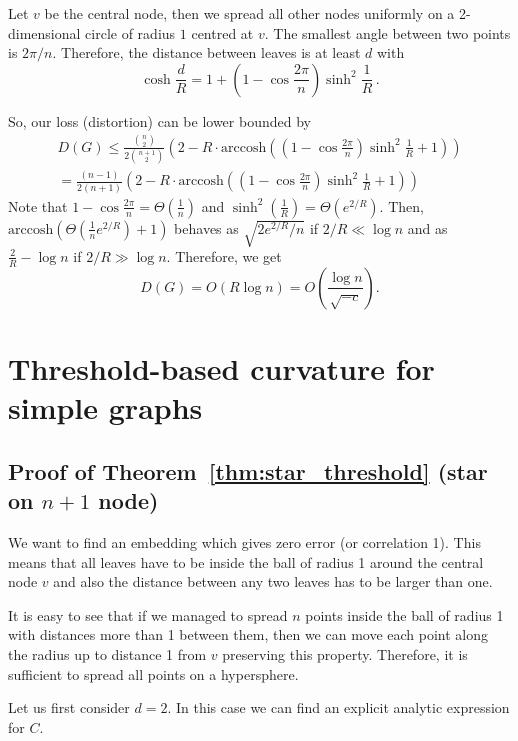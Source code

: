 \documentclass{article} %
\begin{document}
Let $v$ be the central node, then we spread all other nodes uniformly on a 2-dimensional circle of radius $1$ centred at $v$. The smallest angle between two points is $2 \pi / n$. Therefore, the distance between leaves is at least $d$ with
\[
\cosh \frac{d}{R} = 1  + \left(1 -  \cos \frac{2 \pi}{n}\right)  \sinh^2 \frac{1}{R} \,.
\]


So, our loss (distortion) can be lower bounded by
\begin{multline*}
D(G) \le \frac{{n \choose 2}}{2{n+1\choose 2}} \left(2 - R\cdot \mathrm{arccosh}\left( \left(1 - \cos \frac{2 \pi}{n}\right)\sinh^2\frac{1}{R}  + 1 \right)\right) \\
= \frac{(n-1)}{2(n+1)} \left(2 - R\cdot \mathrm{arccosh}\left( \left(1 - \cos \frac{2 \pi}{n}\right)\sinh^2\frac{1}{R}  + 1 \right)\right)
\end{multline*}
Note that $1 - \cos\frac{2\pi}{n} = \Theta\left(\frac{1}{n}\right)$ and $\sinh^2\left(\frac{1}{R}\right) = \Theta\left(e^{2/R}\right)$.
Then, $\textrm{arccosh}\left(\Theta\left(\frac{1}{n} e^{2/R}\right) + 1 \right)$ behaves as $\sqrt{2e^{2/R}/n}$ if $2/R \ll \log n$ and as $\frac{2}{R} - \log n$ if $2/R \gg \log n$.
Therefore, we get
\[
D(G) = O\left( R \log n \right) = O\left( \frac{\log n}{\sqrt{-c}} \right).
\]

\section{Threshold-based curvature for simple graphs}

\subsection{Proof of Theorem~\ref{thm:star_threshold} (star on $n+1$ node)}

We want to find an embedding which gives zero error (or correlation 1). This means that all leaves have to be inside the ball of radius 1 around the central node $v$ and also the distance between any two leaves has to be larger than one. 

It is easy to see that if we managed to spread $n$ points inside the ball of radius 1 with distances more than 1 between them, then we can move each point along the radius up to distance 1 from $v$ preserving this property. Therefore, it is sufficient to spread all points on a hypersphere. 

Let us first consider $d = 2$. In this case we can find an explicit analytic expression for $C$.
\end{document}
